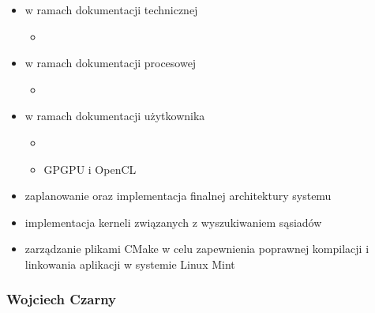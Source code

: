 \documentclass[polish, 12pt]{aghthesis}
\begin{document}
		\begin{itemize}
		
			\item w ramach dokumentacji technicznej
			
				\begin{itemize}
				
					\item
				
				\end{itemize}
			
			\item w ramach dokumentacji procesowej
			
				\begin{itemize}
				
					\item
				
				\end{itemize}
			
			\item w ramach dokumentacji użytkownika
			
				\begin{itemize}
				
					\item
					
					\item GPGPU i OpenCL
				
				\end{itemize}
			
			\item zaplanowanie oraz implementacja finalnej architektury systemu
			
			\item implementacja kerneli związanych z wyszukiwaniem sąsiadów
			
			\item zarządzanie plikami CMake w celu zapewnienia poprawnej kompilacji i linkowania aplikacji w systemie Linux Mint
		
		\end{itemize}
		
	\subsubsection*{Wojciech Czarny} 
		
\end{document}
